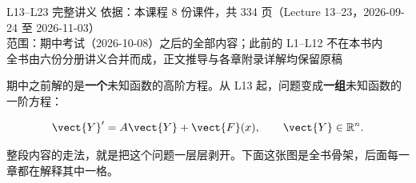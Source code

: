 \documentclass[11pt]{ctexart}
\begin{document}
{L13--L23 完整讲义}%
{依据：本课程 8 份课件，共 334 页（Lecture 13--23，2026-09-24 至 2026-11-03）\\
范围：期中考试（2026-10-08）之后的全部内容；此前的 L1--L12 不在本书内\\
全书由六份分册讲义合并而成，正文推导与各章附录详解均保留原稿}





期中之前解的是\textbf{一个}未知函数的高阶方程。从 L13 起，问题变成\textbf{一组}未知函数的一阶方程：

\[
\vect{Y}'=A\vect{Y}+\vect{F}(x),\qquad \vect{Y}\in\mathbb{R}^{n}.
\]

整段内容的走法，就是把这个问题一层层剥开。下面这张图是全书骨架，后面每一章都在解释其中一格。
\end{document}
